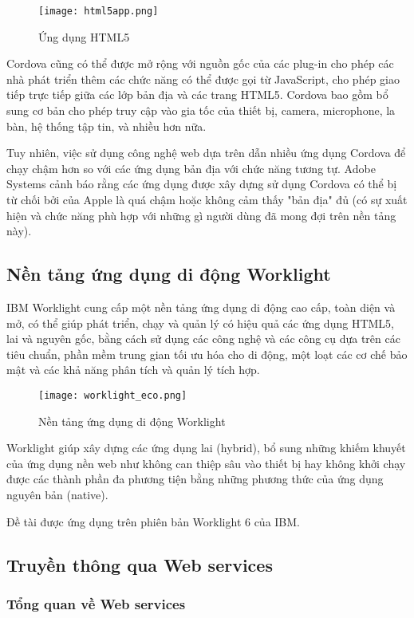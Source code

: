 \begin{figure}[!htb] 
\centering
\texttt{[image: html5app.png]}
\caption{Ứng dụng HTML5}
\end{figure}

Cordova cũng có thể được mở rộng với nguồn gốc của các plug-in cho phép các nhà phát triển thêm các chức năng có thể được gọi từ JavaScript, cho phép giao tiếp trực tiếp giữa các lớp bản địa và các trang HTML5. Cordova bao gồm bổ sung cơ bản cho phép truy cập vào gia tốc của thiết bị, camera, microphone, la bàn, hệ thống tập tin, và nhiều hơn nữa.

Tuy nhiên, việc sử dụng công nghệ web dựa trên dẫn nhiều ứng dụng Cordova để chạy chậm hơn so với các ứng dụng bản địa với chức năng tương tự. Adobe Systems cảnh báo rằng các ứng dụng được xây dựng sử dụng Cordova có thể bị từ chối bởi của Apple là quá chậm hoặc không cảm thấy "bản địa" đủ (có sự xuất hiện và chức năng phù hợp với những gì người dùng đã mong đợi trên nền tảng này).

\subsection{Nền tảng ứng dụng di động Worklight}

IBM Worklight cung cấp một nền tảng ứng dụng di động cao cấp, toàn diện và mở, có thể giúp phát triển, chạy và quản lý có hiệu quả các ứng dụng HTML5, lai và nguyên gốc, bằng cách sử dụng các công nghệ và các công cụ dựa trên các tiêu chuẩn, phần mềm trung gian tối ưu hóa cho di động, một loạt các cơ chế bảo mật và các khả năng phân tích và quản lý tích hợp.

\begin{figure}[!htb] 
\centering
\texttt{[image: worklight\_eco.png]}
\caption{Nền tảng ứng dụng di động Worklight}
\end{figure}

Worklight giúp xây dựng các ứng dụng lai (hybrid), bổ sung những khiếm khuyết của ứng dụng nền web như không can thiệp sâu vào thiết bị hay không khởi chạy được các thành phần đa phương tiện bằng những phương thức của ứng dụng nguyên bản (native).

Đề tài được ứng dụng trên phiên bản Worklight 6 của IBM.

\subsection{Truyền thông qua Web services}
\subsubsection{Tổng quan về Web services}

